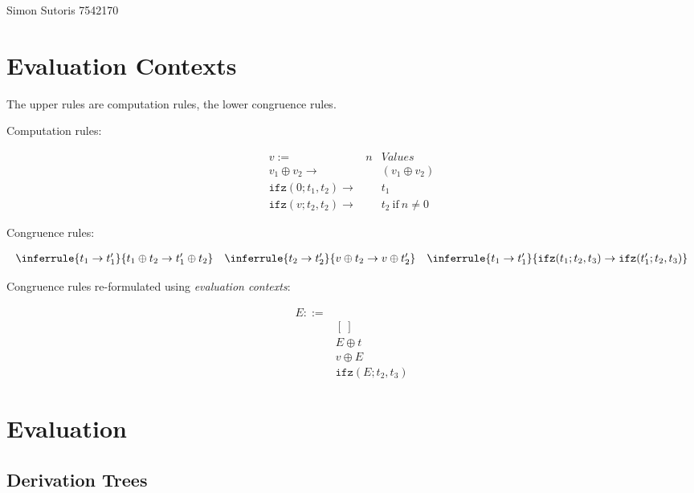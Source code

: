 \documentclass{article}
\begin{document}
Simon Sutoris 7542170

\section*{Evaluation Contexts}

The upper rules are computation rules, the lower congruence rules.

Computation rules:

\[
\begin{array}{rlr}
v := & n & Values \\
v_1 \oplus v_2 \rightarrow & & (v_1 \oplus v_2) \\
\texttt{ifz}(0; t_1, t_2) \rightarrow & & t_1 \\
\texttt{ifz}(v; t_2, t_2) \rightarrow & & t_2\ \text{if}\ n \ne 0
\end{array}
\]

Congruence rules:

\[
\begin{array}{ccc}
\inferrule{t_1 \rightarrow t'_1}{t_1 \oplus t_2 \rightarrow t'_1 \oplus t_2} &
\inferrule{t_2 \rightarrow t'_2}{v \oplus t_2 \rightarrow v \oplus t'_2} &
\inferrule{t_1 \rightarrow t'_1}{\texttt{ifz}(t_1; t_2, t_3) \rightarrow \texttt{ifz}(t'_1; t_2, t_3)}
\end{array}
\]

Congruence rules re-formulated using \textit{evaluation contexts}:

\[
\begin{array}{ll}
E ::= & \\
& [\ ] \\
& E \oplus t \\
& v \oplus E \\
& \texttt{ifz}(E; t_2, t_3)
\end{array}
\]

\section*{Evaluation}

\subsection*{Derivation Trees}
\end{document}
